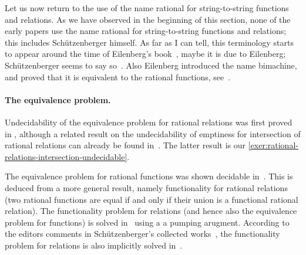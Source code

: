 Let us now return to the use of the name rational for string-to-string functions and relations. As we have observed in the beginning of this section, none of the early papers use the name rational for string-to-string functions and relations; this includes Sch\"utzenberger himself. As far as I can tell, this terminology starts to appear around the time of Eilenberg's book~\cite[Chapter VII]{eilenberg1974}, maybe it is due to Eilenberg; Sch\"utzenberger seems to say so~\cite[Introduction]{reutenauer1991minimization}. Also Eilenberg introduced the name bimachine, and proved that it is equivalent to the rational functions, see~\cite[Chapter XI, Theorem 7.1]{eilenberg1974}.


\paragraph*{The equivalence problem.} Undecidability of the equivalence problem for rational relations was first proved in
\cite[p.410]{Griffiths1968}, although a related result on the undecidability of emptiness for intersection of rational relations can already be found in~\cite[Theorem 18]{RabinScott59}. The latter result  is our \cref{exer:rational-relations-intersection-undecidable}. 

The equivalence problem for rational functions was shown decidable in~\cite[Theorem 1]{blattner1977single}. This is deduced from a more general result, namely functionality for rational relations (two rational functions are equal if and only if their union is a functional rational relation). The functionality problem for relations (and hence also the equivalence problem for functions) is solved in~\cite{blattner1977single} using a a pumping arugment.    
 According to the editors comments in Sch\"utzenberger's collected works~\cite[p.4]{schutzenberger_oeuvres_tome08}, the functionality problem for relations is also implicitly solved in~\cite{schutzenberger1976}. 
 
